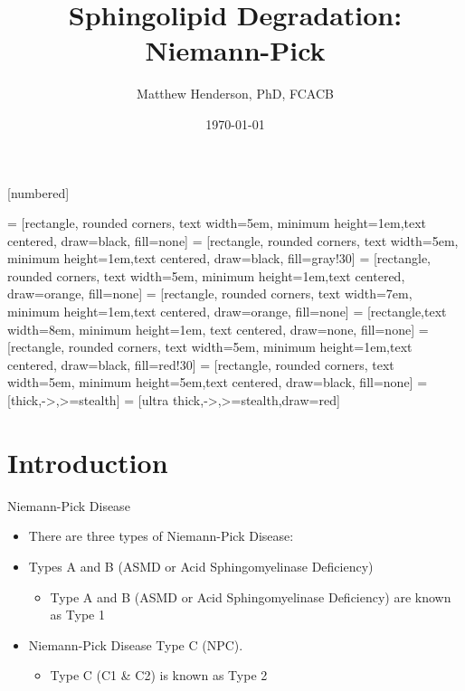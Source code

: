 \documentclass[presentation, smaller]{beamer}
\author{Matthew Henderson, PhD, FCACB}
\date{\today}
\title{Sphingolipid Degradation: Niemann-Pick}
\institute[NSO]{Newborn Screening Ontario | The University of Ottawa}
\begin{document}
\maketitle

\vspace{220pt}
\beamertemplatenavigationsymbolsempty
{}[numbered]

 = [rectangle, rounded corners, text width=5em, minimum height=1em,text centered, draw=black, fill=none]
 = [rectangle, rounded corners, text width=5em, minimum height=1em,text centered, draw=black, fill=gray!30]
 = [rectangle, rounded corners, text width=5em, minimum height=1em,text centered, draw=orange, fill=none]
 = [rectangle, rounded corners, text width=7em, minimum height=1em,text centered, draw=orange, fill=none]
 = [rectangle,text width=8em, minimum height=1em, text centered, draw=none, fill=none]
 = [rectangle, rounded corners, text width=5em, minimum height=1em,text centered, draw=black, fill=red!30]
 = [rectangle, rounded corners, text width=5em, minimum height=5em,text centered, draw=black, fill=none]
 = [thick,->,>=stealth]
 = [ultra thick,->,>=stealth,draw=red]

\section{Introduction}
\label{sec:orgheadline10}

\begin{frame}[label={sec:orgheadline1}]{Niemann-Pick Disease}
\begin{itemize}
\item There are three types of Niemann-Pick Disease:
\item Types A and B (ASMD or Acid Sphingomyelinase Deficiency)
\begin{itemize}
\item Type A and B (ASMD or Acid Sphingomyelinase Deficiency) are known as Type 1
\end{itemize}
\item Niemann-Pick Disease Type C (NPC).
\begin{itemize}
\item Type C (C1 \& C2) is known as Type 2
\end{itemize}
\end{itemize}
\end{frame}
\end{document}
